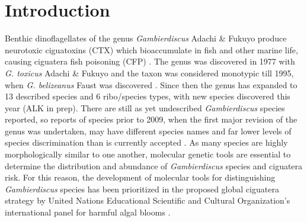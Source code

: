 \documentclass[12pt]{article}
\begin{document}
\section{Introduction}
Benthic dinoflagellates of the genus \emph{Gambierdiscus} Adachi \& Fukuyo produce neurotoxic ciguatoxins (CTX) which bioaccumulate in fish and other marine life, causing ciguatera fish poisoning (CFP) \citep{chinain1997intraspecific,holmes1998gambierdiscus}. The genus was discovered in 1977 with \emph{G. toxicus} Adachi \& Fukuyo \citep{adachi1979thecal} and the taxon was considered monotypic till 1995, when \emph{G. belizeanus} Faust was discovered \citep{faust1995observation}. Since then the genus has expanded to 13 described species and 6 ribo/species types, with new species discovered this year \citep{fraga2016gambierdiscus,litaker2010global,adachi1979thecal,faust1995observation,chinain1999morphology,litaker2009taxonomy,nishimura2014morphology,fraga2011gambierdiscus,xu2014distribution,fraga2014genus} (ALK in prep).
There are still as yet undescribed \textit{Gambierdiscus }species reported,  so reports of species prior to 2009, when the first major revision of the genus was undertaken, may have different species names and far lower levels of species discrimination than is currently accepted \citep{berdalet2012global,nishimura2014morphology}. As many species are highly morphologically similar to one another, molecular genetic tools are essential to determine the distribution and abundance of  \textit{Gambierdiscus} species  and ciguatera risk. For this reason, the development of molecular tools for distinguishing \textit{Gambierdiscus} species has been prioritized in the proposed global ciguatera strategy by United Nations Educational Scientific and Cultural Organization's international panel for harmful algal blooms \citep{litaker2010global,globalcig}. \\
\end{document}
